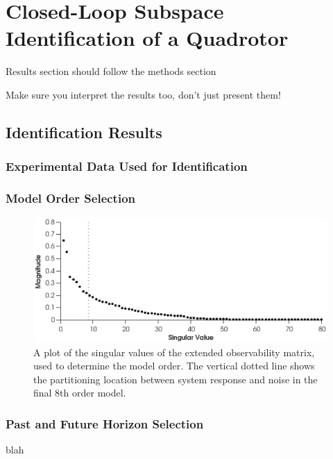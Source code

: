 \chapter{Closed-Loop Subspace Identification of a Quadrotor}\label{results}

Results section should follow the methods section

Make sure you interpret the results too, don't just present them!

\section{Identification Results}



\subsection{Experimental Data Used for Identification}




\subsection{Model Order Selection}
\begin{figure}[htb!]\label{fig:5_singular_values}
	\centering
	\includegraphics{../fig/singular_values_parsim.eps}
	\caption{A plot of the singular values of the extended observability matrix, used to determine the model order. The vertical dotted line shows the partitioning location between system response and noise in the final 8th order model.}
\end{figure}



\subsection{Past and Future Horizon Selection}

blah

